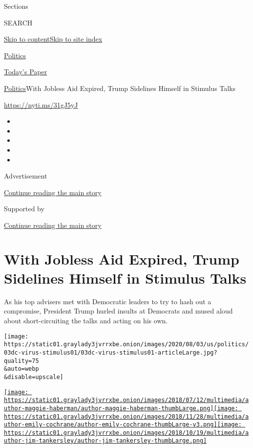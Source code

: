 Sections

SEARCH

\protect\hyperlink{site-content}{Skip to
content}\protect\hyperlink{site-index}{Skip to site index}

\href{https://www.nytimes3xbfgragh.onion/section/politics}{Politics}

\href{https://myaccount.nytimes3xbfgragh.onion/auth/login?response_type=cookie\&client_id=vi}{}

\href{https://www.nytimes3xbfgragh.onion/section/todayspaper}{Today's
Paper}

\href{/section/politics}{Politics}\textbar{}With Jobless Aid Expired,
Trump Sidelines Himself in Stimulus Talks

\url{https://nyti.ms/31gJ5yJ}

\begin{itemize}
\item
\item
\item
\item
\item
\end{itemize}

Advertisement

\protect\hyperlink{after-top}{Continue reading the main story}

Supported by

\protect\hyperlink{after-sponsor}{Continue reading the main story}

\hypertarget{with-jobless-aid-expired-trump-sidelines-himself-in-stimulus-talks}{%
\section{With Jobless Aid Expired, Trump Sidelines Himself in Stimulus
Talks}\label{with-jobless-aid-expired-trump-sidelines-himself-in-stimulus-talks}}

As his top advisers met with Democratic leaders to try to hash out a
compromise, President Trump hurled insults at Democrats and mused aloud
about short-circuiting the talks and acting on his own.

\texttt{[image: https://static01.graylady3jvrrxbe.onion/images/2020/08/03/us/politics/03dc-virus-stimulus01/03dc-virus-stimulus01-articleLarge.jpg?quality=75\\\&auto=webp\\\&disable=upscale]}

\href{https://www.nytimes3xbfgragh.onion/by/maggie-haberman}{\texttt{[image: https://static01.graylady3jvrrxbe.onion/images/2018/07/12/multimedia/author-maggie-haberman/author-maggie-haberman-thumbLarge.png]}}\href{https://www.nytimes3xbfgragh.onion/by/emily-cochrane}{\texttt{[image: https://static01.graylady3jvrrxbe.onion/images/2018/11/28/multimedia/author-emily-cochrane/author-emily-cochrane-thumbLarge-v3.png]}}\href{https://www.nytimes3xbfgragh.onion/by/jim-tankersley}{\texttt{[image: https://static01.graylady3jvrrxbe.onion/images/2018/10/19/multimedia/author-jim-tankersley/author-jim-tankersley-thumbLarge.png]}}

